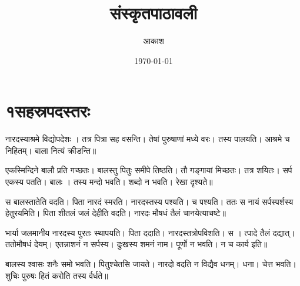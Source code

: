 \documentclass[12pt]{nextbook}
\title{संस्कृतपाठावली}
\author{आकाश}
\date{\today}
\begin{document}
\frontmatter
\maketitle
\tableofcontents
\mainmatter
\chapter{१सहस्रपदस्तरः}
\begin{readersection}{नारदस्याश्रमे विद्योपदेशः}
  । तत्र   पित्रा सह वसन्ति। तेषां   पुरुषाणां मध्ये वरः। तस्य   पालयति। आश्रमे  च निहितम्।  बाला नित्यं क्रीडन्ति॥

एकस्मिन्दिने  बालौ  प्रति गच्छतः।  बालस्तु पितुः समीपे तिष्ठति। तौ गङ्गायां मिच्छतः। तत्र  शयितः। सर्प एकस्य  पतति। बालः । तस्य  मन्दो भवति।  शब्दो न भवति।   रेखा दृश्यते॥

स बालस्तातेति वदति। पिता नारदं स्मरति। नारदस्तस्य  पश्यति।  च पश्यति। ततः स  नायं   सर्पस्पर्शस्य हेतुरयमिति। पिता शीतलं जलं देहीति वदति। नारदः मौषधं तैलं चानयेत्याचष्टे॥

भार्या जलमानीय नारदस्य पुरतः स्थापयति। पिता  ददाति। नारदस्तत्रोपविशति। स  । त्पादे तैलं दद्यात्। ततोमौषधं  देयम्। एतन्नाशनं न सर्पस्य। दुःखस्य शमनं नाम। पूर्णो  न भवति। न च  कार्य इति॥

बालस्य श्वासः शनैः समो भवति। पितुश्चेतसि  जायते। नारदो वदति  न  विद्यैव धनम्।  धना।   चेत्त भवति।  शुचिः पुरुषः  हितं करोति  तस्य र्वर्धते॥


\end{readersection}
\end{document}
